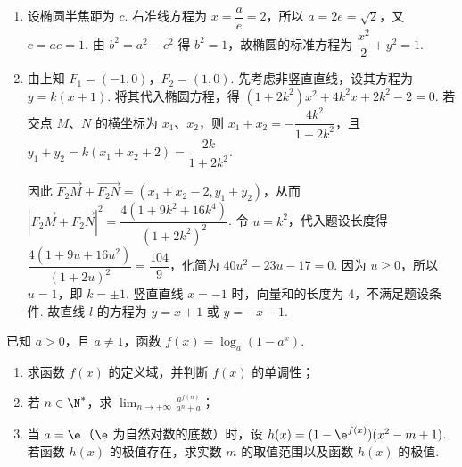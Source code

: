 \begin{solution}
\begin{enumerate}
\item 设椭圆半焦距为 \(c\). 右准线方程为 \(x=\dfrac{a}{e}=2\)，所以 \(a=2e=\sqrt2\)，又 \(c=ae=1\). 由 \(b^2=a^2-c^2\) 得 \(b^2=1\)，故椭圆的标准方程为 \(\dfrac{x^2}{2}+y^2=1\).
\item 由上知 \(F_1=(-1,0)\)，\(F_2=(1,0)\). 先考虑非竖直直线，设其方程为 \(y=k(x+1)\). 将其代入椭圆方程，得 \((1+2k^2)x^2+4k^2x+2k^2-2=0\). 若交点 \(M\)、\(N\) 的横坐标为 \(x_1\)、\(x_2\)，则
\(x_1+x_2=-\dfrac{4k^2}{1+2k^2}\)，且 \(y_1+y_2=k(x_1+x_2+2)=\dfrac{2k}{1+2k^2}\).

因此 \(\overrightarrow{F_2M}+\overrightarrow{F_2N}=(x_1+x_2-2,y_1+y_2)\)，从而
\(\left|\overrightarrow{F_2M}+\overrightarrow{F_2N}\right|^2=\dfrac{4(1+9k^2+16k^4)}{(1+2k^2)^2}\). 令 \(u=k^2\)，代入题设长度得 \(\dfrac{4(1+9u+16u^2)}{(1+2u)^2}=\dfrac{104}{9}\)，化简为 \(40u^2-23u-17=0\). 因为 \(u\geqslant0\)，所以 \(u=1\)，即 \(k=\pm1\). 竖直直线 \(x=-1\) 时，向量和的长度为 \(4\)，不满足题设条件. 故直线 \(l\) 的方程为 \(y=x+1\) 或 \(y=-x-1\).
\end{enumerate}
\end{solution}

\begin{problem}
已知 \(a > 0\)，且 \(a \neq 1\)，函数 \(f(x) = \log_a(1 - a^x)\).

\begin{enumerate}
\item 求函数 \(f(x)\) 的定义域，并判断 \(f(x)\) 的单调性；
\item 若 \(n \in \N^*\)，求 \(\displaystyle\lim_{n \to +\infty} \frac{a^{f(n)}}{a^n + a}\)；
\item 当 \(a = \e\)（\(\e\) 为自然对数的底数）时，设 \(h(x) = (1 - \e^{f(x)})(x^2 - m + 1)\). 若函数 \(h(x)\) 的极值存在，求实数 \(m\) 的取值范围以及函数 \(h(x)\) 的极值.
\end{enumerate}
\end{problem}

